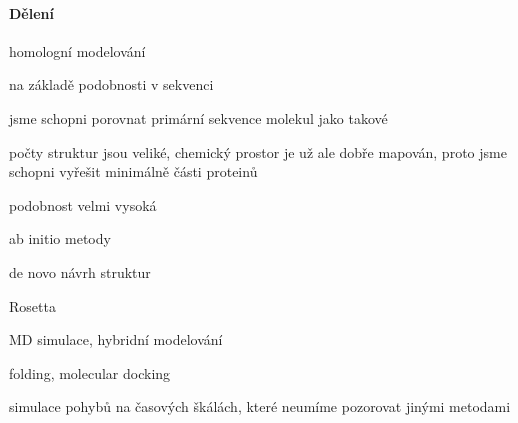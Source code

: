 \documentclass[DIV=8]{scrreprt}
\begin{document}
\paragraph{Dělení}
\begin{myItemize}[nosep]
    \item homologní modelování
\begin{myItemize}[nosep]
    \item na základě podobnosti v sekvenci
    \item jsme schopni porovnat primární sekvence molekul jako takové
    \item počty struktur jsou veliké, chemický prostor je už ale dobře mapován, proto jsme schopni vyřešit minimálně části proteinů
    \item podobnost velmi vysoká
\end{myItemize}

    \item ab initio metody
\begin{myItemize}[nosep]
    \item de novo návrh struktur
    \item Rosetta
\end{myItemize}

    \item MD simulace, hybridní modelování
\begin{myItemize}[nosep]
    \item folding, molecular docking
    \item simulace pohybů na časových škálách, které neumíme pozorovat jinými metodami
\end{myItemize}

\end{myItemize}
\end{document}
